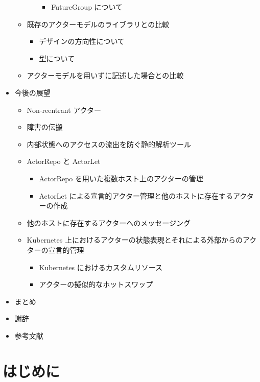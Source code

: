 \begin{itemize}
\begin{itemize}
\begin{itemize}
      \begin{itemize}
      \item
        FutureGroup について
      \end{itemize}
    \end{itemize}
  \item
    既存のアクターモデルのライブラリとの比較

    \begin{itemize}
    \item
      デザインの方向性について
    \item
      型について
    \end{itemize}
  \item
    アクターモデルを用いずに記述した場合との比較
  \end{itemize}
\item
  今後の展望

  \begin{itemize}
  \item
    Non-reentrant アクター
  \item
    障害の伝搬
  \item
    内部状態へのアクセスの流出を防ぐ静的解析ツール
  \item
    ActorRepo と ActorLet

    \begin{itemize}
    \item
      ActorRepo を用いた複数ホスト上のアクターの管理
    \item
      ActorLet
      による宣言的アクター管理と他のホストに存在するアクターの作成
    \end{itemize}
  \item
    他のホストに存在するアクターへのメッセージング
  \item
    Kubernetes
    上におけるアクターの状態表現とそれによる外部からのアクターの宣言的管理

    \begin{itemize}
    \item
      Kubernetes におけるカスタムリソース
    \item
      アクターの擬似的なホットスワップ
    \end{itemize}
  \end{itemize}
\item
  まとめ
\item
  謝辞
\item
  参考文献
\end{itemize}

\section{はじめに}

